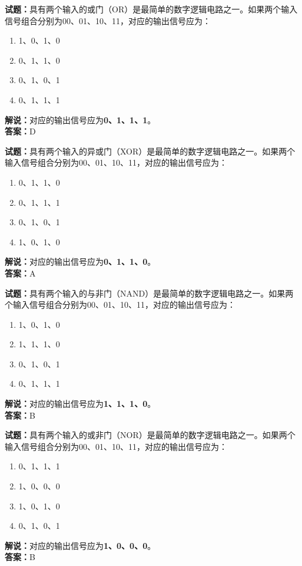 \documentclass{ctexbook}
\begin{document}
\vspace{1em}

\textbf{试题：}具有两个输入的或门（OR）是最简单的数字逻辑电路之一。如果两个输入信号组合分别为00、01、10、11，对应的输出信号应为：
\begin{enumerate}[leftmargin=3em]
  \item 1、0、1、0
  \item 0、1、1、0
  \item 0、1、0、1
  \item 0、1、1、1
\end{enumerate}
\noindent\textbf{解说：}对应的输出信号应为\textbf{0、1、1、1}。\\\noindent\textbf{答案：}D

\vspace{1em}

\textbf{试题：}具有两个输入的异或门（XOR）是最简单的数字逻辑电路之一。如果两个输入信号组合分别为00、01、10、11，对应的输出信号应为：
\begin{enumerate}[leftmargin=3em]
  \item 0、1、1、0
  \item 0、1、1、1
  \item 0、1、0、1
  \item 1、0、1、0
\end{enumerate}
\noindent\textbf{解说：}对应的输出信号应为\textbf{0、1、1、0}。\\\noindent\textbf{答案：}A

\vspace{1em}

\textbf{试题：}具有两个输入的与非门（NAND）是最简单的数字逻辑电路之一。如果两个输入信号组合分别为00、01、10、11，对应的输出信号应为：
\begin{enumerate}[leftmargin=3em]
  \item 1、0、1、0
  \item 1、1、1、0
  \item 0、1、0、1
  \item 0、1、1、1
\end{enumerate}
\noindent\textbf{解说：}对应的输出信号应为\textbf{1、1、1、0}。\\\noindent\textbf{答案：}B

\vspace{1em}

\textbf{试题：}具有两个输入的或非门（NOR）是最简单的数字逻辑电路之一。如果两个输入信号组合分别为00、01、10、11，对应的输出信号应为：
\begin{enumerate}[leftmargin=3em]
  \item 0、1、1、1
  \item 1、0、0、0
  \item 1、0、1、0
  \item 0、1、0、1
\end{enumerate}
\noindent\textbf{解说：}对应的输出信号应为\textbf{1、0、0、0}。\\\noindent\textbf{答案：}B
\end{document}
